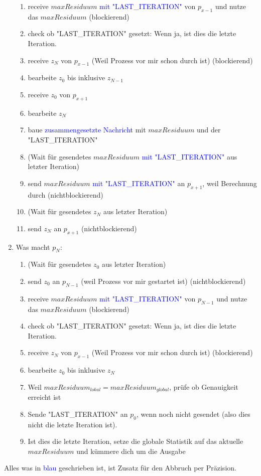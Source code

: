 \documentclass[a4paper,10pt]{article}
\begin{document}
\begin{enumerate}
\begin{enumerate}
        \item receive $maxResiduum$ \textcolor{blue}{mit "LAST\_ITERATION"} von $p_{x-1}$ und nutze das $maxResiduum$ (blockierend)
        \color{blue}
        \item check ob "LAST\_ITERATION" gesetzt: Wenn ja, ist dies die letzte Iteration.
        \color{black}
        \item receive $z_N$ von $p_{x-1}$ (Weil Prozess vor mir schon durch ist) (blockierend)
        \item bearbeite $z_0$ bis inklusive $z_{N-1}$
        \item receive $z_0$ von $p_{x+1}$
        \item bearbeite $z_N$
        \item baue \textcolor{blue}{zusammengesetzte Nachricht} mit $maxResiduum$ und der "LAST\_ITERATION"
        \item (Wait für gesendetes $maxResiduum$ \textcolor{blue}{mit "LAST\_ITERATION"} aus letzter Iteration)
        \item send $maxResiduum$ \textcolor{blue}{mit "LAST\_ITERATION"} an $p_{x+1}$, weil Berechnung durch (nichtblockierend)
        \item (Wait für gesendetes $z_N$ aus letzter Iteration)
        \item send $z_N$ an $p_{x+1}$ (nichtblockierend)
    \end{enumerate}
    \item Was macht $p_N$:
    \begin{enumerate}
        \item (Wait für gesendetes $z_0$ aus letzter Iteration)
        \item send $z_0$ an $p_{N-1}$ (weil Prozess vor mir gestartet ist) (nichtblockierend)
        \item receive $maxResiduum$ \textcolor{blue}{mit "LAST\_ITERATION"} von $p_{N-1}$ und nutze das $maxResiduum$ (blockierend)
        \color{blue}
        \item check ob "LAST\_ITERATION" gesetzt: Wenn ja, ist dies die letzte Iteration.
        \color{black}
        \item receive $z_N$ von $p_{x-1}$ (Weil Prozess vor mir schon durch ist) (blockierend)
        \item bearbeite $z_0$ bis inklusive $z_{N}$
        \color{blue}
        \item Weil $maxResiduum_{lokal} = maxResiduum_{global}$, prüfe ob Genauigkeit erreicht ist
        \item Sende "LAST\_ITERATION" an $p_0$, wenn noch nicht gesendet (also dies nicht die letzte Iteration ist).
        \color{black}
        \item Ist dies die letzte Iteration, setze die globale Statistik auf das aktuelle $maxResiduum$ und kümmere dich um die Ausgabe
    \end{enumerate}
\end{enumerate}

Alles was in \textcolor{blue}{blau} geschrieben ist, ist Zusatz für den Abbruch per Präzision.
\end{document}
